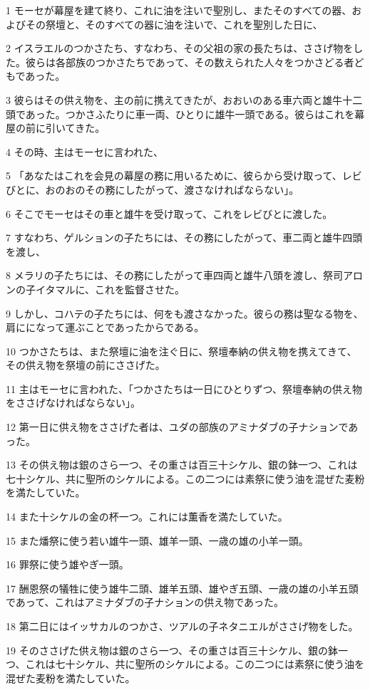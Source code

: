 \par 1 モーセが幕屋を建て終り、これに油を注いで聖別し、またそのすべての器、およびその祭壇と、そのすべての器に油を注いで、これを聖別した日に、
\par 2 イスラエルのつかさたち、すなわち、その父祖の家の長たちは、ささげ物をした。彼らは各部族のつかさたちであって、その数えられた人々をつかさどる者どもであった。
\par 3 彼らはその供え物を、主の前に携えてきたが、おおいのある車六両と雄牛十二頭であった。つかさふたりに車一両、ひとりに雄牛一頭である。彼らはこれを幕屋の前に引いてきた。
\par 4 その時、主はモーセに言われた、
\par 5 「あなたはこれを会見の幕屋の務に用いるために、彼らから受け取って、レビびとに、おのおのその務にしたがって、渡さなければならない」。
\par 6 そこでモーセはその車と雄牛を受け取って、これをレビびとに渡した。
\par 7 すなわち、ゲルションの子たちには、その務にしたがって、車二両と雄牛四頭を渡し、
\par 8 メラリの子たちには、その務にしたがって車四両と雄牛八頭を渡し、祭司アロンの子イタマルに、これを監督させた。
\par 9 しかし、コハテの子たちには、何をも渡さなかった。彼らの務は聖なる物を、肩にになって運ぶことであったからである。
\par 10 つかさたちは、また祭壇に油を注ぐ日に、祭壇奉納の供え物を携えてきて、その供え物を祭壇の前にささげた。
\par 11 主はモーセに言われた、「つかさたちは一日にひとりずつ、祭壇奉納の供え物をささげなければならない」。
\par 12 第一日に供え物をささげた者は、ユダの部族のアミナダブの子ナションであった。
\par 13 その供え物は銀のさら一つ、その重さは百三十シケル、銀の鉢一つ、これは七十シケル、共に聖所のシケルによる。この二つには素祭に使う油を混ぜた麦粉を満たしていた。
\par 14 また十シケルの金の杯一つ。これには薫香を満たしていた。
\par 15 また燔祭に使う若い雄牛一頭、雄羊一頭、一歳の雄の小羊一頭。
\par 16 罪祭に使う雄やぎ一頭。
\par 17 酬恩祭の犠牲に使う雄牛二頭、雄羊五頭、雄やぎ五頭、一歳の雄の小羊五頭であって、これはアミナダブの子ナションの供え物であった。
\par 18 第二日にはイッサカルのつかさ、ツアルの子ネタニエルがささげ物をした。
\par 19 そのささげた供え物は銀のさら一つ、その重さは百三十シケル、銀の鉢一つ、これは七十シケル、共に聖所のシケルによる。この二つには素祭に使う油を混ぜた麦粉を満たしていた。
